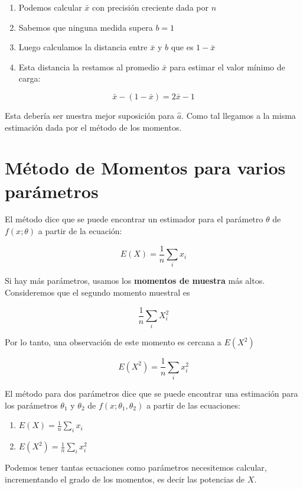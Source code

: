 \documentclass[
]{book}
\providecommand{\tightlist}{%
  \setlength{\itemsep}{0pt}\setlength{\parskip}{0pt}}
\begin{document}
\begin{enumerate}
\def\labelenumi{\alph{enumi})}
\tightlist
\item
  Podemos calcular \(\bar{x}\) con precisión creciente dada por \(n\)
\item
  Sabemos que ninguna medida supera \(b=1\)
\item
  Luego calculamos la distancia entre \(\bar{x}\) y \(b\) que es \(1-\bar{x}\)
\item
  Esta distancia la restamos al promedio \(\bar{x}\) para estimar el valor mínimo de carga:
\end{enumerate}

\[\bar{x}-(1-\bar{x})=2\bar{x}-1\]

Esta debería ser nuestra mejor suposición para \(\hat{a}\). Como tal llegamos a la misma estimación dada por el método de los momentos.

\hypertarget{muxe9todo-de-momentos-para-varios-paruxe1metros}{%
\section{Método de Momentos para varios parámetros}\label{muxe9todo-de-momentos-para-varios-paruxe1metros}}

El método dice que se puede encontrar un estimador para el parámetro \(\theta\) de \(f(x;\theta)\) a partir de la ecuación:

\[E(X)=\frac{1}{n}\sum_i x_i\]

Si hay más parámetros, usamos los \textbf{momentos de muestra} más altos. Consideremos que el segundo momento muestral es

\[\frac{1}{n}\sum_i X^2_i\]

Por lo tanto, una observación de este momento es cercana a \(E(X^2)\)

\[E(X ^ 2)=\frac{1}{n}\sum_i x^2_i\]

El método para dos parámetros dice que se puede encontrar una estimación para los parámetros \(\theta_1\) y \(\theta_2\) de \(f(x;\theta_1,\theta_2)\) a partir de las ecuaciones:

\begin{enumerate}
\def\labelenumi{\alph{enumi}.}
\item
  \(E(X)= \frac{1}{n}\sum_i x_i\)
\item
  \(E(X^2)=\frac{1}{n}\sum_i x^2_i\)
\end{enumerate}

Podemos tener tantas ecuaciones como parámetros necesitemos calcular, incrementando el grado de los momentos, es decir las potencias de \(X\).
\end{document}
